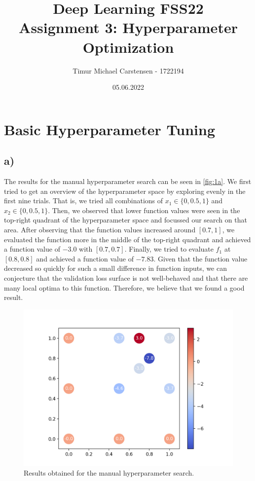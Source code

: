 \documentclass[11pt]{article}
\title{Deep Learning FSS22 \\ Assignment 3: Hyperparameter Optimization}
\author{Timur Michael Carstensen - 1722194}
\date{05.06.2022}
\begin{document}

\maketitle


\newpage

\tableofcontents

\newpage



\section{Basic Hyperparameter Tuning}\label{sec:cnn}

\subsection{a)}\label{subsec:basic-a}

The results for the manual hyperparameter search can be seen in \autoref{fig:1a}. We first tried to get an overview of the hyperparameter space by exploring evenly in the first nine trials. That is, we tried all combinations of $x_1\in\{0, 0.5, 1\}$ and $x_2\in\{0, 0.5, 1\}$. Then, we observed that lower function values were seen in the top-right quadrant of the hyperparameter space and focussed our search on that area. After observing that the function values increased around $[0.7, 1]$, we evaluated the function more in the middle of the top-right quadrant and achieved a function value of $-3.0$ with $[0.7, 0.7]$. Finally, we tried to evaluate $f_1$ at $[0.8, 0.8]$ and achieved a function value of $-7.83$. Given that the function value decreased so quickly for such a small difference in function inputs, we can conjecture that the validation loss surface is not well-behaved and that there are many local optima to this function. Therefore, we believe that we found a good result. 


\begin{figure}[H]
  	\center
  	\includegraphics[width=.6\columnwidth]{assets/1a}
  	\caption{Results obtained for the manual hyperparameter search.}
  	\label{fig:1a}
\end{figure}
\end{document}
